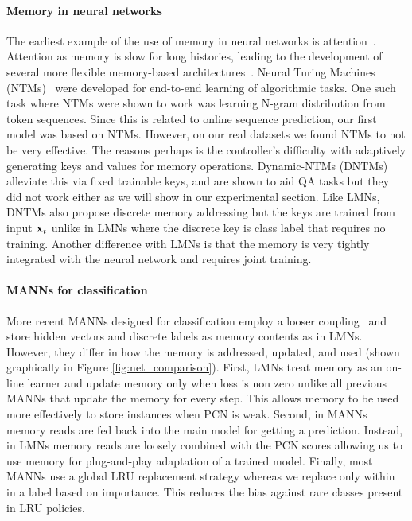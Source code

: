 \documentclass[letterpaper]{article} %
\newcommand{\vek}[1]{{\bf {#1}}}
\newcommand{\vx}{{\vek{x}}}
\begin{document}
\paragraph{Memory in neural networks}
The earliest example of the use of memory in neural networks is attention~.
Attention as memory is slow for long histories, leading to the development of several more flexible memory-based architectures~\cite{Weston16}.
Neural Turing Machines (NTMs)~\cite{GravesNTM} were developed for end-to-end learning of algorithmic tasks. One such task where NTMs were shown to work was learning N-gram distribution from token sequences. Since this is related to online sequence prediction, our first model was based on NTMs.  However, on our real datasets we found NTMs to not be very effective. The reasons perhaps is the controller's difficulty with adaptively generating keys and values for memory operations.  Dynamic-NTMs (DNTMs)~\cite{GulcehreCCB16} alleviate this via fixed trainable keys, and are shown to aid QA tasks but they did not work either as we will show in our experimental section.
Like LMNs, DNTMs also propose discrete memory addressing but the keys are trained from input $\vx_t$ unlike in LMNs where the discrete key is class label that requires no training.
Another difference with LMNs is that the memory is very tightly integrated with the neural network and requires joint training.



\paragraph{MANNs for classification}
More recent MANNs designed for classification employ a looser coupling~\cite{kaiser2017,SantoroBBWL16} and store hidden vectors and discrete labels as memory contents as in LMNs.
However, they differ in how the memory is addressed, updated, and used (shown graphically in Figure \ref{fig:net_comparison}).
First, LMNs treat memory as an on-line learner and update memory only when loss is non zero unlike all previous MANNs that update the memory for every step.  This allows memory to be used more effectively to store instances when PCN is weak.
Second, in MANNs memory reads are fed back into the main model for getting a prediction.  Instead, in LMNs memory reads are loosely combined with the PCN scores allowing us to use memory for plug-and-play adaptation of a trained model.  Finally, most MANNs use a global LRU replacement strategy whereas we replace only within in a label based on importance. This reduces the bias against rare classes present in LRU policies.
\end{document}
